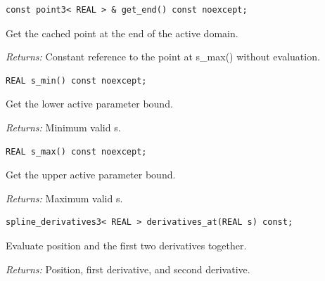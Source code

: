 \par\noindent\begin{minipage}{\linewidth}
\begin{lstlisting}[style=apireference]
const point3< REAL > & get_end() const noexcept;
\end{lstlisting}
{\footnotesize Get the cached point at the end of the active domain.\par}
{\footnotesize\textit{Returns:} Constant reference to the point at s\_max() without evaluation.\par}
\end{minipage}\par\vspace{1pt}
\par\noindent\begin{minipage}{\linewidth}
\begin{lstlisting}[style=apireference]
REAL s_min() const noexcept;
\end{lstlisting}
{\footnotesize Get the lower active parameter bound.\par}
{\footnotesize\textit{Returns:} Minimum valid s.\par}
\end{minipage}\par\vspace{1pt}
\par\noindent\begin{minipage}{\linewidth}
\begin{lstlisting}[style=apireference]
REAL s_max() const noexcept;
\end{lstlisting}
{\footnotesize Get the upper active parameter bound.\par}
{\footnotesize\textit{Returns:} Maximum valid s.\par}
\end{minipage}\par\vspace{1pt}
\par\noindent\begin{minipage}{\linewidth}
\begin{lstlisting}[style=apireference]
spline_derivatives3< REAL > derivatives_at(REAL s) const;
\end{lstlisting}
{\footnotesize Evaluate position and the first two derivatives together.\par}
{\footnotesize\textit{Returns:} Position, first derivative, and second derivative.\par}
\end{minipage}\par\vspace{1pt}
